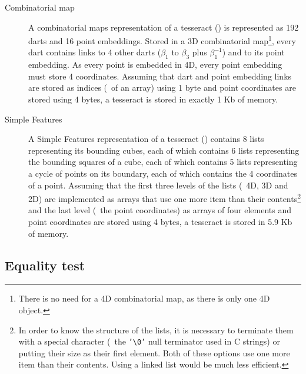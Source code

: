 \begin{description}
\item[Combinatorial map] A combinatorial maps representation of a tesseract () is represented as 192 darts and 16 point embeddings.
Stored in a 3D combinatorial map\footnote{There is no need for a 4D combinatorial map, as there is only one 4D object.}, every dart contains links to 4 other darts ($\beta_1$ to $\beta_3$ plus $\beta_1^{-1}$) and to its point embedding.
As every point is embedded in 4D, every point embedding must store 4 coordinates.
Assuming that dart and point embedding links are stored as indices (\eg\ of an array) using 1 byte and point coordinates are stored using 4 bytes, a tesseract is stored in exactly 1 Kb of memory.

\item[Simple Features] A Simple Features representation of a tesseract () contains 8 lists representing its bounding cubes, each of which contains 6 lists representing the bounding squares of a cube, each of which contains 5 lists representing a cycle of points on its boundary, each of which contains the 4 coordinates of a point.
Assuming that the first three levels of the lists (\ie\ 4D, 3D and 2D) are implemented as arrays that use one more item than their contents\footnote{In order to know the structure of the lists, it is necessary to terminate them with a special character (\eg\ the \texttt{'\textbackslash0'} null terminator used in C strings) or putting their size as their first element. Both of these options use one more item than their contents. Using a linked list would be much less efficient.} and the last level (\ie\ the point coordinates) as arrays of four elements and point coordinates are stored using 4 bytes, a tesseract is stored in 5.9 Kb of memory.
\end{description}

\subsection*{Equality test}


